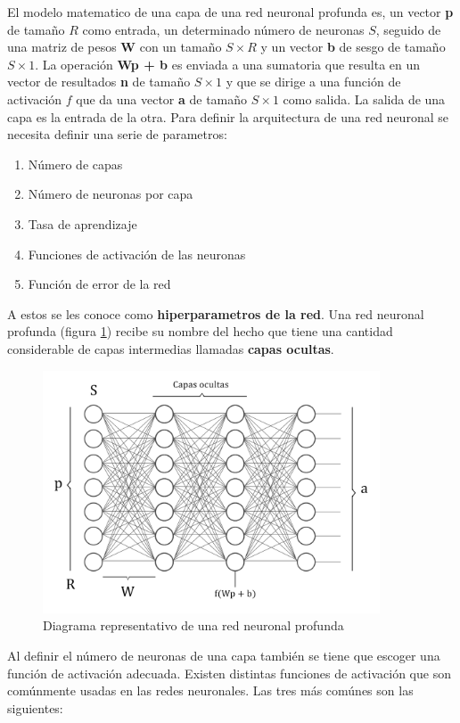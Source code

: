 \documentclass{article}
\begin{document}
El modelo matematico de una capa de una red neuronal profunda es, un vector \textbf{p} de tamaño $R$ como entrada, un determinado número de neuronas $S$, seguido de una matriz de pesos \textbf{W} con un tamaño $S\times$$R$ y un vector \textbf{b} de sesgo de tamaño $S\times1$. 
La operación \textbf{Wp + b} es enviada a una sumatoria que resulta en un vector de resultados \textbf{n} de tamaño $S\times1$ y que se dirige a una función de activación $f$ que da una vector \textbf{a} de tamaño $S\times1$ como salida. La salida de una capa es la entrada de la otra.
Para definir la arquitectura de una red neuronal se necesita definir una serie de parametros:
\begin{enumerate}
    \item Número de capas
    \item Número de neuronas por capa
    \item Tasa de aprendizaje
    \item Funciones de activación de las neuronas
    \item Función de error de la red
\end{enumerate}
A estos se les conoce como \textbf{hiperparametros de la red}. Una red neuronal profunda (figura \ref{multi}) recibe su nombre del hecho que tiene una cantidad considerable de capas intermedias llamadas \textbf{capas ocultas}.
\begin{figure}[H]
    \centering
    \includegraphics[width=100mm]{multi.png}
    \caption{Diagrama representativo de una red neuronal profunda}
    \label{multi}
\end{figure}
Al definir el número de neuronas de una capa también se tiene que escoger una función de activación adecuada.
Existen distintas funciones de activación que son comúnmente usadas en las redes neuronales. Las tres más comúnes son las siguientes:  \\
$$
\end{document}
